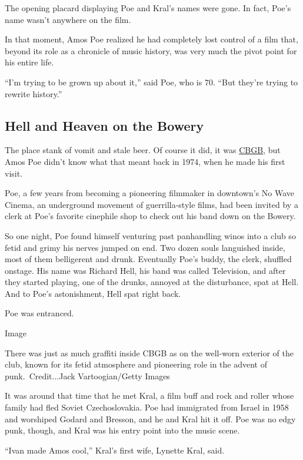 The opening placard displaying Poe and Kral's names were gone. In fact,
Poe's name wasn't anywhere on the film.

In that moment, Amos Poe realized he had completely lost control of a
film that, beyond its role as a chronicle of music history, was very
much the pivot point for his entire life.

``I'm trying to be grown up about it,'' said Poe, who is 70. ``But
they're trying to rewrite history.''

\hypertarget{hell-and-heaven-on-the-bowery}{%
\subsection{Hell and Heaven on the
Bowery}\label{hell-and-heaven-on-the-bowery}}

The place stank of vomit and stale beer. Of course it did, it was
\href{https://www.cbgb.com/}{CBGB}, but Amos Poe didn't know what that
meant back in 1974, when he made his first visit.

Poe, a few years from becoming a pioneering filmmaker in downtown's No
Wave Cinema, an underground movement of guerrilla-style films, had been
invited by a clerk at Poe's favorite cinephile shop to check out his
band down on the Bowery.

So one night, Poe found himself venturing past panhandling winos into a
club so fetid and grimy his nerves jumped on end. Two dozen souls
languished inside, most of them belligerent and drunk. Eventually Poe's
buddy, the clerk, shuffled onstage. His name was Richard Hell, his band
was called Television, and after they started playing, one of the
drunks, annoyed at the disturbance, spat at Hell. And to Poe's
astonishment, Hell spat right back.

Poe was entranced.

Image

There was just as much graffiti inside CBGB as on the well-worn exterior
of the club, known for its fetid atmosphere and pioneering role in the
advent of punk.~Credit...Jack Vartoogian/Getty Images

It was around that time that he met Kral, a film buff and rock and
roller whose family had fled Soviet Czechoslovakia. Poe had immigrated
from Israel in 1958 and worshiped Godard and Bresson, and he and Kral
hit it off. Poe was no edgy punk, though, and Kral was his entry point
into the music scene.

``Ivan made Amos cool,'' Kral's first wife, Lynette Kral, said.

